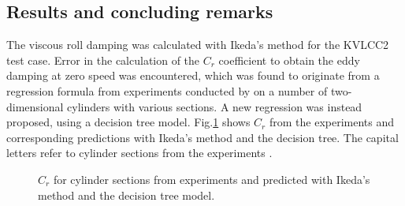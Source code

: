 \subsection*{Results and concluding remarks}
The viscous roll damping was calculated with Ikeda's method \cite{ikeda_components_1978} for the KVLCC2 test case. Error in the calculation of the $C_r$ coefficient to obtain the eddy damping at zero speed was encountered, which was found to originate from a regression formula from experiments conducted by \textcite{ikeda_eddy_1978} on a number of two-dimensional cylinders with various sections. A new regression was instead proposed, using a decision tree model.
Fig.\ref{fig:ikeda_sections} shows $C_r$ from the experiments and corresponding predictions with Ikeda's method and the decision tree. The capital letters refer to cylinder sections from the experiments
\cite{ikeda_eddy_1978}.
\begin{figure}[h]
\vspace{-0.4cm}
\caption{$C_r$ for cylinder sections from experiments and predicted with Ikeda's method and the decision tree model.}
\label{fig:ikeda_sections}
\end{figure}
\FloatBarrier

